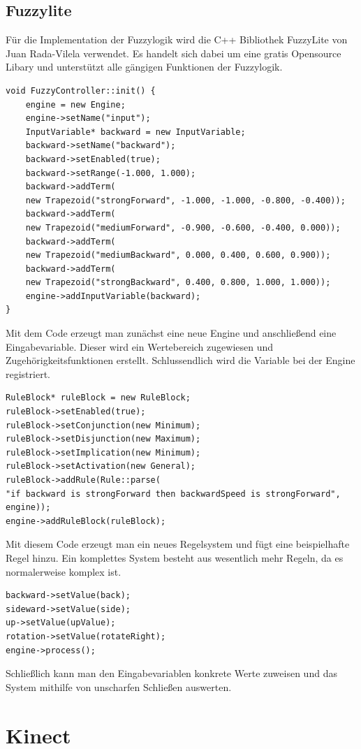 \subsection{Fuzzylite}
Für die Implementation der Fuzzylogik wird die C++ Bibliothek FuzzyLite von Juan Rada-Vilela verwendet. Es handelt sich dabei um eine gratis Opensource Libary und unterstützt alle gängigen Funktionen der Fuzzylogik.\cite{fuzzylite}  
\begin{lstlisting}[caption=Beispielcode zur Erzeugung eines neuen Fuzzymodells]
void FuzzyController::init() {
	engine = new Engine;
	engine->setName("input");
	InputVariable* backward = new InputVariable;
	backward->setName("backward");
	backward->setEnabled(true);
	backward->setRange(-1.000, 1.000);
	backward->addTerm(
	new Trapezoid("strongForward", -1.000, -1.000, -0.800, -0.400));
	backward->addTerm(
	new Trapezoid("mediumForward", -0.900, -0.600, -0.400, 0.000));
	backward->addTerm(
	new Trapezoid("mediumBackward", 0.000, 0.400, 0.600, 0.900));
	backward->addTerm(
	new Trapezoid("strongBackward", 0.400, 0.800, 1.000, 1.000));
	engine->addInputVariable(backward);
}
\end{lstlisting}
Mit dem Code erzeugt man zunächst eine neue Engine und anschließend eine Eingabevariable. Dieser wird ein Wertebereich zugewiesen und Zugehörigkeitsfunktionen erstellt. Schlussendlich wird die Variable bei der Engine registriert. 
\begin{lstlisting}[caption=Code zur Erzeugung von einem Regelsystem]
RuleBlock* ruleBlock = new RuleBlock;
ruleBlock->setEnabled(true);
ruleBlock->setConjunction(new Minimum);
ruleBlock->setDisjunction(new Maximum);
ruleBlock->setImplication(new Minimum);
ruleBlock->setActivation(new General);
ruleBlock->addRule(Rule::parse(
"if backward is strongForward then backwardSpeed is strongForward",
engine));
engine->addRuleBlock(ruleBlock);
\end{lstlisting}
Mit diesem Code erzeugt man ein neues Regelsystem und fügt eine beispielhafte Regel hinzu. Ein komplettes System besteht aus wesentlich mehr Regeln, da es normalerweise komplex ist.
\begin{lstlisting}[caption=Code zur Auswertung des Regelsystems]
backward->setValue(back);
sideward->setValue(side);
up->setValue(upValue);
rotation->setValue(rotateRight);
engine->process();
\end{lstlisting}
Schließlich kann man den Eingabevariablen konkrete Werte zuweisen und das System mithilfe von unscharfen Schließen auswerten.

\section{Kinect}
